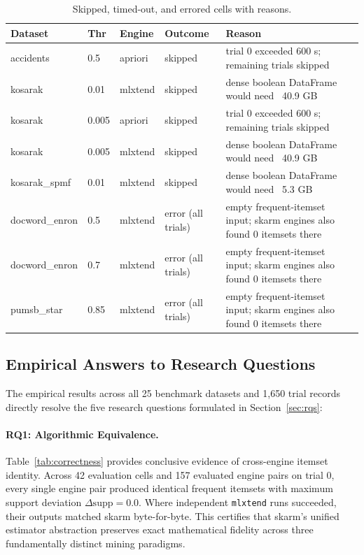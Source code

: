 \documentclass[twocolumn,10pt]{article}
\newcommand{\skarm}{\textsf{skarm}\xspace}
\begin{document}
\begin{table}[t]
\centering
\footnotesize
\caption{Skipped, timed-out, and errored cells with reasons.}
\label{tab:skips}
\begin{tabular}{llllp{5.5cm}}
\toprule
Dataset & Thr & Engine & Outcome & Reason \\
\midrule
accidents & 0.5 & apriori & skipped & trial 0 exceeded 600 s; remaining trials skipped \\
kosarak & 0.01 & mlxtend & skipped & dense boolean DataFrame would need ~40.9 GB \\
kosarak & 0.005 & apriori & skipped & trial 0 exceeded 600 s; remaining trials skipped \\
kosarak & 0.005 & mlxtend & skipped & dense boolean DataFrame would need ~40.9 GB \\
kosarak\_spmf & 0.01 & mlxtend & skipped & dense boolean DataFrame would need ~5.3 GB \\
docword\_enron & 0.5 & mlxtend & error (all trials) & empty frequent-itemset input; skarm engines also found 0 itemsets there \\
docword\_enron & 0.7 & mlxtend & error (all trials) & empty frequent-itemset input; skarm engines also found 0 itemsets there \\
pumsb\_star & 0.85 & mlxtend & error (all trials) & empty frequent-itemset input; skarm engines also found 0 itemsets there \\
\bottomrule
\end{tabular}
\end{table}

\subsection{Empirical Answers to Research Questions}
\label{sec:rq_answers}
The empirical results across all 25 benchmark datasets and 1,650 trial records directly resolve the five research questions formulated in Section~\ref{sec:rqs}:

\paragraph{RQ1: Algorithmic Equivalence.} Table~\ref{tab:correctness} provides conclusive evidence of cross-engine itemset identity. Across 42 evaluation cells and 157 evaluated engine pairs on trial 0, every single engine pair produced identical frequent itemsets with maximum support deviation $\Delta\mathrm{supp} = 0.0$. Where independent \texttt{mlxtend} runs succeeded, their outputs matched \skarm byte-for-byte. This certifies that \skarm's unified estimator abstraction preserves exact mathematical fidelity across three fundamentally distinct mining paradigms.
\end{document}

